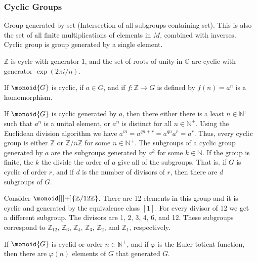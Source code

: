         \subsubsection{Cyclic Groups}
            Group generated by set (Intersection of all subgroups
            containing set). This is also the set of all finite
            multiplications of elements in $M$, combined with inverses.
            Cyclic group is group generated by a single element.
            \begin{example}
                $\mathbb{Z}$ is cycle with generator 1, and the set of roots
                of unity in $\mathbb{C}$ are cyclic with generator
                $\exp(2\pi{i}/n)$.
            \end{example}
            \begin{theorem}
                If $\monoid{G}$ is cyclic, if $a\in{G}$, and if
                $f:\mathbb{Z}\rightarrow{G}$ is defined by $f(n)=a^{n}$ is
                a homomorphism.
            \end{theorem}
            If $\monoid{G}$ is cyclic generated by $a$, then there either
            there is a least $n\in\mathbb{N}^{+}$ such that $a^{n}$ is a
            unital element, or $a^{n}$ is distinct for all
            $n\in\mathbb{N}^{+}$. Using the Euclidean division algorithm we
            have $a^{m}=a^{qn+r}=a^{qn}a^{r}=a^{r}$. Thus, every cyclic
            group is either $\mathbb{Z}$ or $\mathbb{Z}/n\mathbb{Z}$ for
            some $n\in\mathbb{N}^{+}$. The subgroups of a cyclic group
            generated by $a$ are the subgroups generated by $a^{k}$ for some
            $k\in\mathbb{N}$. If the group is finite, the $k$ the divide
            the order of $a$ give all of the subgroups. That is, if
            $G$ is cyclic of order $r$, and if $d$ is the number of divisors
            of $r$, then there are $d$ subgroups of $G$.
            \begin{example}
                Consider $\monoid[][+]{\mathbb{Z}/12\mathbb{Z}}$. There are
                12 elements in this group and it is cyclic and generated by
                the equivalence class $[1]$. For every divisor of 12 we get
                a different subgroup. The divisors are 1, 2, 3, 4, 6, and
                12. These subgroups correspond to $\mathbb{Z}_{12}$,
                $\mathbb{Z}_{6}$, $\mathbb{Z}_{4}$, $\mathbb{Z}_{3}$,
                $\mathbb{Z}_{2}$, and $\mathbb{Z}_{1}$, respectively.
            \end{example}
            \begin{theorem}
                If $\monoid{G}$ is cyclid or order $n\in\mathbb{N}^{+}$, and
                if $\varphi$ is the Euler totient function, then there are
                $\varphi(n)$ elements of $G$ that generated $G$.
            \end{theorem}
